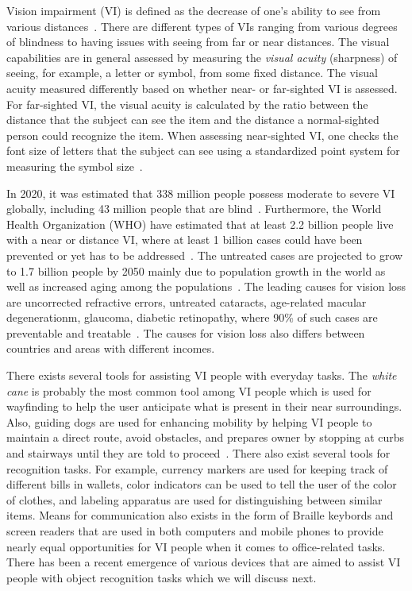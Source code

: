 Vision impairment (VI) is defined as the decrease of one's ability to see from various distances~\cite{who2022international}. There are different types of VIs ranging from various degrees of blindness to having issues with seeing from far or near distances. The visual capabilities are in general assessed by measuring the \textit{visual acuity} (sharpness) of seeing, for example, a letter or symbol, from some fixed distance. The visual acuity measured differently based on whether near- or far-sighted VI is assessed. For far-sighted VI, the visual acuity is calculated by the ratio between the distance that the subject can see the item and the distance a normal-sighted person could recognize the item. When assessing near-sighted VI, one checks the font size of letters that the subject can see using a standardized point system for measuring the symbol size~\cite{who2019world}. %

In 2020, it was estimated that 338 million people possess moderate to severe VI globally, including 43 million people that are blind~\cite{bourne2021trends}. 
Furthermore, the World Health Organization (WHO) have estimated that at least 2.2 billion people live with a near or distance VI, where at least 1 billion cases could have been prevented or yet has to be addressed~\cite{who2019world}. The untreated cases are projected to grow to 1.7 billion people by 2050 mainly due to population growth in the world as well as increased aging among the populations~\cite{bourne2021trends}. 
The leading causes for vision loss are uncorrected refractive errors, untreated cataracts, age-related macular degenerationm, glaucoma, diabetic retinopathy, where 90\% of such cases are preventable and treatable~\cite{steinmetz2021causes}. The causes for vision loss also differs between countries and areas with different incomes.  

There exists several tools for assisting VI people with everyday tasks. The \textit{white cane} is probably the most common tool among VI people which is used for wayfinding to help the user anticipate what is present in their near surroundings. Also, guiding dogs are used for enhancing mobility by helping VI people to maintain a direct route, avoid obstacles, and prepares owner by stopping at curbs and stairways until they are told to proceed~\cite{manduchi2012computer}. There also exist several tools for recognition tasks. For example, currency markers are used for keeping track of different bills in wallets, color indicators can be used to tell the user of the color of clothes, and labeling apparatus are used for distinguishing between similar items. Means for communication also exists in the form of Braille keybords and screen readers that are used in both computers and mobile phones to provide nearly equal opportunities for VI people when it comes to office-related tasks. There has been a recent emergence of various devices that are aimed to assist VI people with object recognition tasks which we will discuss next.  




